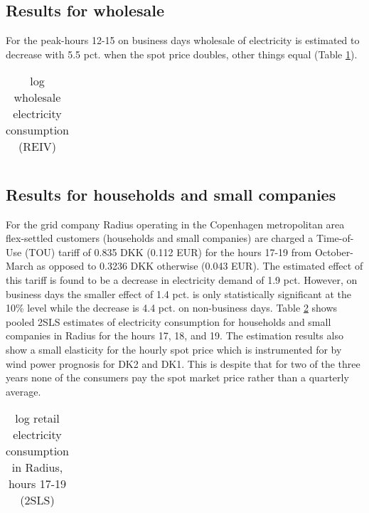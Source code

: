 \label{sec:results}
\subsection{Results for wholesale}
\label{subsec:r_wholesale}
For the peak-hours 12-15 on business days wholesale of electricity is estimated to decrease with 5.5 pct. when the spot price doubles, other things equal (Table \ref{tab:ws_preferred}).
\begin{table}[H]
  \vspace{-0.0cm}
  \centering
  \caption{log wholesale electricity consumption (REIV)}
  \footnotesize
    \begin{tabular}{lcccc}
      \toprule
        
    \end{tabular}
  \label{tab:ws_preferred}
  \vspace{-0.0cm}
\end{table}


\subsection{Results for households and small companies}
For the grid company Radius operating in the Copenhagen metropolitan area flex-settled customers (households and small companies) are charged a Time-of-Use (TOU) tariff of 0.835 DKK (0.112 EUR) for the hours 17-19 from October-March as opposed to 0.3236 DKK otherwise (0.043 EUR). The estimated effect of this tariff is found to be a decrease in electricity demand of 1.9 pct. However, on business days the smaller effect of 1.4 pct. is only statistically significant at the 10\% level while the decrease is 4.4 pct. on non-business days. Table \ref{tab:hh_17-19} shows pooled 2SLS estimates of electricity consumption for households and small companies in Radius for the hours 17, 18, and 19. The estimation results also show a small elasticity for the hourly spot price which is instrumented for by wind power prognosis for DK2 and DK1. This is despite that for two of the three years none of the consumers pay the spot market price rather than a quarterly average.
\label{subsec:r_households}
\begin{table}[H]
  \vspace{-0.0cm}
  \centering
  \caption{log retail electricity consumption in Radius, hours 17-19 (2SLS)}
  \footnotesize
    \begin{tabular}{lccc}
      \toprule
        
    \end{tabular}
  \label{tab:hh_17-19}
  \vspace{-0.0cm}
\end{table}


